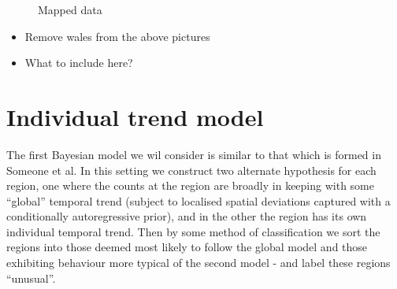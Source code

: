 \documentclass{article}
\begin{document}
\begin{figure}
\centering
{}
\caption{Mapped data}
\end{figure}

\begin{itemize}
\item Remove wales from the above pictures
\item What to include here?
\end{itemize}


\section{Individual trend model}

The first Bayesian model we wil consider is similar to that which is formed in Someone et al. In this setting we construct two alternate hypothesis for each region, one where the counts at the region are broadly in keeping with some ``global'' temporal trend (subject to localised spatial deviations captured with a conditionally autoregressive prior), and in the other the region has its own individual temporal trend. Then by some method of classification we sort the regions into those deemed most likely to follow the global model and those exhibiting behaviour more typical of the second model - and label these regions ``unusual''.
\end{document}
